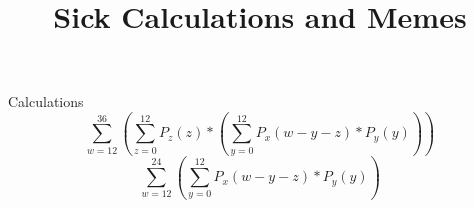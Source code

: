 \documentclass{article}
\title{Sick Calculations and Memes}
\begin{document}
   \maketitle
   Calculations
 	$$\sum_{w=12}^{36} (\sum_{z=0}^{12} P_z(z) * (\sum_{y=0}^{12} P_x(w-y-z) * P_y(y)))$$
 	$$\sum_{w=12}^{24} (\sum_{y=0}^{12} P_x(w-y-z) * P_y(y))$$
 	$$$$	
\end{document}
